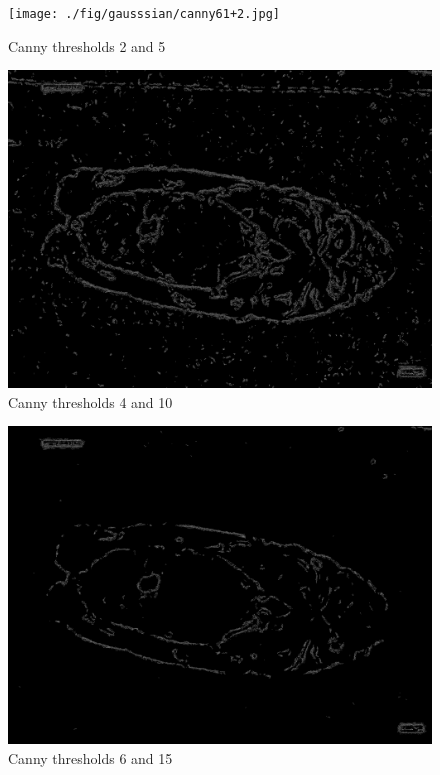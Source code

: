 \begin{figure}[H]
    \centering
    \begin{minipage}{0.45\textwidth}
        \centering
        \texttt{[image: ./fig/gausssian/canny61+2.jpg]}
        \caption{Canny thresholds 2 and 5}
        \label{fig:canny2_5}
    \end{minipage}
    \begin{minipage}{0.45\textwidth}
        \centering
        \includegraphics[width=\textwidth]{./fig/gausssian/canny61+4.jpg}
        \caption{Canny thresholds 4 and 10}
        \label{fig:canny4_10}
    \end{minipage}
\end{figure}

\begin{figure}[H]
    \centering
    \begin{minipage}{0.45\textwidth}
        \centering
        \includegraphics[width=\textwidth]{./fig/gausssian/canny61+6.jpg}
        \caption{Canny thresholds 6 and 15}
        \label{fig:canny6_15}
    \end{minipage}
\end{figure}

